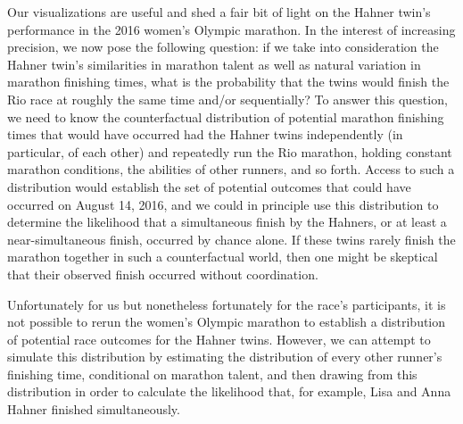 \documentclass[12pt,titlepage]{article}
\begin{document}
Our visualizations are useful and shed a fair bit of light on the
Hahner twin's performance in the 2016 women's Olympic marathon.  In
the interest of increasing precision, we now pose the following
question: if we take into consideration the Hahner twin's similarities
in marathon talent as well as natural variation in marathon finishing
times, what is the probability that the twins would finish the Rio
race at roughly the same time and/or sequentially?  To answer this
question, we need to know the counterfactual distribution of potential
marathon finishing times that would have occurred had the Hahner twins
independently (in particular, of each other) and repeatedly run the
Rio marathon, holding constant marathon conditions, the abilities of
other runners, and so forth.  Access to such a distribution would
establish the set of potential outcomes that could have occurred on
August 14, 2016, and we could in principle use this distribution to
determine the likelihood that a simultaneous finish by the Hahners, or
at least a near-simultaneous finish, occurred by chance alone.  If
these twins rarely finish the marathon together in such a
counterfactual world, then one might be skeptical that their observed
finish occurred without coordination.

Unfortunately for us but nonetheless fortunately for the race's
participants, it is not possible to rerun the women's Olympic marathon
to establish a distribution of potential race outcomes for the Hahner
twins.  However, we can attempt to simulate this distribution by
estimating the distribution of every other runner's finishing time,
conditional on marathon talent, and then drawing from this
distribution in order to calculate the likelihood that, for example,
Lisa and Anna Hahner finished simultaneously.
\end{document}
